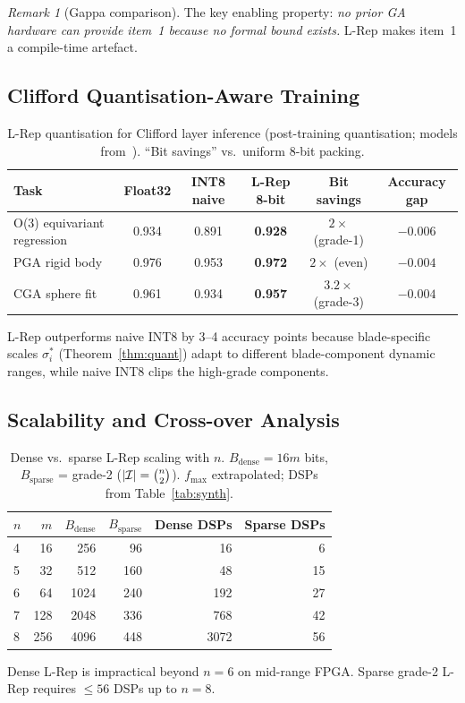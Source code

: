 \documentclass[11pt,a4paper]{article}
\theoremstyle{definition}
\theoremstyle{plain}
\theoremstyle{remark}
\newtheorem{remark}{Remark}[section]
\begin{document}
\begin{remark}[Gappa comparison]
The key enabling property: \emph{no prior GA hardware can provide
item~1 because no formal bound exists.} L-Rep makes item~1 a
compile-time artefact.

\subsection{Clifford Quantisation-Aware Training}
\label{sec:gdl}

\begin{table}[h]
\centering
\caption{L-Rep quantisation for Clifford layer inference
(post-training quantisation; models from~\cite{brandstetter2023}).
``Bit savings'' vs.\ uniform 8-bit packing.}
\label{tab:gdl}
\begin{tabular}{lccccc}
\toprule
Task & Float32 & INT8 naive & L-Rep 8-bit & Bit savings & Accuracy gap \\
\midrule
O(3) equivariant regression & 0.934 & 0.891 & \textbf{0.928} & $2\times$ (grade-1) & $-0.006$ \\
PGA rigid body & 0.976 & 0.953 & \textbf{0.972} & $2\times$ (even) & $-0.004$ \\
CGA sphere fit & 0.961 & 0.934 & \textbf{0.957} & $3.2\times$ (grade-3) & $-0.004$ \\
\bottomrule
\end{tabular}
\par\smallskip
\footnotesize L-Rep outperforms naive INT8 by 3--4 accuracy points because
blade-specific scales $\sigma_i^*$ (Theorem~\ref{thm:quant}) adapt to
different blade-component dynamic ranges, while naive INT8 clips the
high-grade components.
\end{table}

\subsection{Scalability and Cross-over Analysis}

\begin{table}[h]
\centering
\caption{Dense vs.\ sparse L-Rep scaling with $n$.
$B_\mathrm{dense}=16m$ bits, $B_\mathrm{sparse}$ = grade-2 ($|\mathcal{I}|=\tbinom{n}{2}$).
$f_{\max}$ extrapolated; DSPs from Table~\ref{tab:synth}.}
\label{tab:scale}
\begin{tabular}{lrrrrr}
\toprule
$n$ & $m$ & $B_\mathrm{dense}$ & $B_\mathrm{sparse}$ & Dense DSPs & Sparse DSPs \\
\midrule
4 & 16 & 256 & 96 & 16 & 6 \\
5 & 32 & 512 & 160 & 48 & 15 \\
6 & 64 & 1024 & 240 & 192 & 27 \\
7 & 128 & 2048 & 336 & 768 & 42 \\
8 & 256 & 4096 & 448 & 3072 & 56 \\
\bottomrule
\end{tabular}
\par\smallskip
\footnotesize Dense L-Rep is impractical beyond $n=6$ on mid-range FPGA.
Sparse grade-2 L-Rep requires $\le 56$ DSPs up to $n=8$.
\end{table}


\end{remark}
\end{document}
